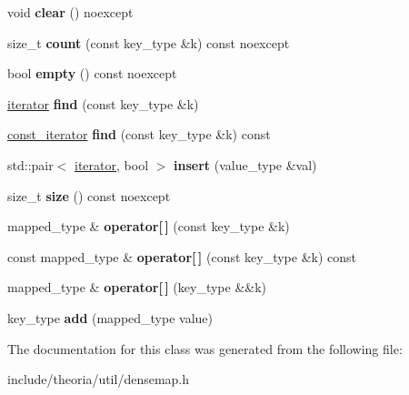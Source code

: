 \begin{DoxyCompactItemize}
void {\bfseries clear} () noexcept
\item 
\mbox{\label{classtheoria_1_1util_1_1densemap_ad06bf0be6b547e08f57588c78cc8b3f6}} 
size\+\_\+t {\bfseries count} (const key\+\_\+type \&k) const noexcept
\item 
\mbox{\label{classtheoria_1_1util_1_1densemap_aff92774c3fb8a22bef1178348845304f}} 
bool {\bfseries empty} () const noexcept
\item 
\mbox{\label{classtheoria_1_1util_1_1densemap_acf76f330db3de660d40b624c18f92f4c}} 
\hyperlink{classtheoria_1_1util_1_1densemap_1_1Iter}{iterator} {\bfseries find} (const key\+\_\+type \&k)
\item 
\mbox{\label{classtheoria_1_1util_1_1densemap_a4a7c46d38cd067c3c8f39ff419fa5e1b}} 
\hyperlink{classtheoria_1_1util_1_1densemap_1_1ConstIter}{const\+\_\+iterator} {\bfseries find} (const key\+\_\+type \&k) const
\item 
\mbox{\label{classtheoria_1_1util_1_1densemap_a10d1d4e2e83bab6062f12b63ed78146d}} 
std\+::pair$<$ \hyperlink{classtheoria_1_1util_1_1densemap_1_1Iter}{iterator}, bool $>$ {\bfseries insert} (value\+\_\+type \&val)
\item 
\mbox{\label{classtheoria_1_1util_1_1densemap_a3d482d15fc6ea59df3b04d5672aa22de}} 
size\+\_\+t {\bfseries size} () const noexcept
\item 
\mbox{\label{classtheoria_1_1util_1_1densemap_a98cd543bdf981a2a199f6aaf7e0db02d}} 
mapped\+\_\+type \& {\bfseries operator\mbox{[}$\,$\mbox{]}} (const key\+\_\+type \&k)
\item 
\mbox{\label{classtheoria_1_1util_1_1densemap_a577de87f69a192db354c9030bb2b8cf1}} 
const mapped\+\_\+type \& {\bfseries operator\mbox{[}$\,$\mbox{]}} (const key\+\_\+type \&k) const
\item 
\mbox{\label{classtheoria_1_1util_1_1densemap_aa7556f5cea18d37c8ecacd6907742020}} 
mapped\+\_\+type \& {\bfseries operator\mbox{[}$\,$\mbox{]}} (key\+\_\+type \&\&k)
\item 
\mbox{\label{classtheoria_1_1util_1_1densemap_a9ca5e32347009b58c2c225ee37cbc0fa}} 
key\+\_\+type {\bfseries add} (mapped\+\_\+type value)
\end{DoxyCompactItemize}


The documentation for this class was generated from the following file\+:\begin{DoxyCompactItemize}
\item 
include/theoria/util/densemap.\+h\end{DoxyCompactItemize}
